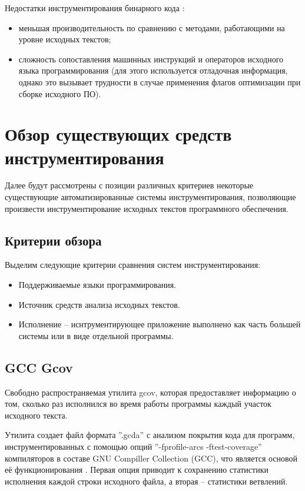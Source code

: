 Недостатки инструментирования бинарного кода \cite{lomakina2016testirovanie}:
\begin{itemize}
  \item меньшая производительность по сравнению с методами, работающими на уровне исходных текстов;
  \item сложность сопоставления машинных инструкций и операторов исходного языка программирования (для этого используется отладочная информация, однако это вызывает трудности в случае применения флагов оптимизации при сборке исходного ПО).
\end{itemize}

\section{Обзор существующих средств инструментирования}

Далее будут рассмотрены с позиции различных критериев некоторые существующие автоматизированные системы инструментирования, позволяющие произвести инструментирование исходных текстов программного обеспечения.

\subsection{Критерии обзора}

Выделим следующие критерии сравнения систем инструментирования:
\begin{itemize}
  \item Поддерживаемые языки программирования.
  \item Источник средств анализа исходных текстов.
  \item Исполнение -- иснтрументирующее приложение выполнено как часть большей системы или в виде отдельной программы.
\end{itemize}

\subsection{GCC Gcov}
Свободно распространяемая утилита gcov, которая предоставляет информацию о том, сколько раз исполнился во время работы программы каждый участок исходного текста.

Утилита создает файл формата ''.gcda'' с анализом покрытия кода для программ, инструментированных с помощью опций ''-fprofile-arcs -ftest-coverage'' компиляторов в составе GNU Compiller Collection (GCC), что является основой её функционирования \cite{reviewGCCGcov}. Первая опция приводит к сохранению статистики исполнения каждой строки исходного файла, а вторая -- статистики ветвлений.

